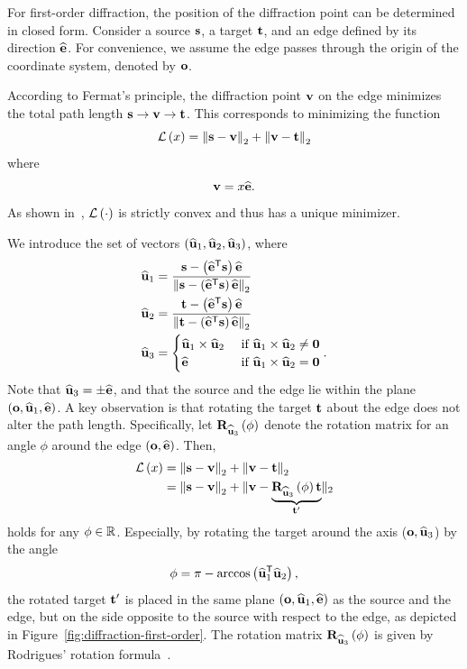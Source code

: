 For first-order diffraction, the position of the diffraction point can be determined in closed form.
Consider a source $\mathbf{s}$, a target $\mathbf{t}$, and an edge defined by its direction $\widehat{\mathbf{e}}$.
For convenience, we assume the edge passes through the origin of the coordinate system, denoted by $\mathbf{o}$.

According to Fermat's principle, the diffraction point $\mathbf{v}$ on the edge minimizes the total path length $\mathbf{s} \rightarrow \mathbf{v} \rightarrow \mathbf{t}$. This corresponds to minimizing the function
\begin{equation}
    {\cal L} \left( x \right) = \left\lVert\mathbf{s} - \mathbf{v}\right\rVert_2 + \left\lVert\mathbf{v} - \mathbf{t}\right\rVert_2
\end{equation}
where
\begin{equation}
    \mathbf{v} = x \widehat{\mathbf{e}}.
\end{equation}
As shown in~\cite{4200889}, ${\cal L}\left( \cdot \right)$ is strictly convex and thus has a unique minimizer.

We introduce the set of vectors $\left( \widehat{\mathbf{u}}_1, \widehat{\mathbf{u}}_2, \widehat{\mathbf{u}}_3 \right)$, where
\begin{align}
    \widehat{\mathbf{u}}_1 &= \frac{\mathbf{s} - \left(\widehat{\mathbf{e}}^{\mathsf{T}} \mathbf{s}\right) \widehat{\mathbf{e}}}{\left\lVert\mathbf{s} - \left(\widehat{\mathbf{e}}^{\mathsf{T}} \mathbf{s}\right) \widehat{\mathbf{e}}\right\rVert_2}\\
    \widehat{\mathbf{u}}_2 &=\frac{\mathbf{t} - \left(\widehat{\mathbf{e}}^{\mathsf{T}} \mathbf{s}\right) \widehat{\mathbf{e}}}{\left\lVert\mathbf{t} - \left(\widehat{\mathbf{e}}^{\mathsf{T}} \mathbf{s}\right) \widehat{\mathbf{e}}\right\rVert_2}\\
    \widehat{\mathbf{u}}_3 &=
    \begin{cases}
        \widehat{\mathbf{u}}_1 \times \widehat{\mathbf{u}}_2 & \text{ if } \widehat{\mathbf{u}}_1 \times \widehat{\mathbf{u}}_2 \neq \mathbf{0}\\
        \widehat{\mathbf{e}} & \text{ if } \widehat{\mathbf{u}}_1 \times \widehat{\mathbf{u}}_2 = \mathbf{0}
    \end{cases}
    .
\end{align}
Note that $\widehat{\mathbf{u}}_3 = \pm \widehat{\mathbf{e}}$, and that the source and the edge lie within the plane $\left( \mathbf{o}, \widehat{\mathbf{u}}_1, \widehat{\mathbf{e}} \right)$.
A key observation is that rotating the target $\mathbf{t}$ about the edge does not alter the path length.
Specifically, let $\mathbf{R}_{\widehat{\mathbf{u}}_3} \left( \phi \right)$ denote the rotation matrix for an angle $\phi$ around the edge $\left( \mathbf{o}, \widehat{\mathbf{e}} \right)$. Then,
\begin{align}
    {\cal L} \left( x \right) &= \left\lVert\mathbf{s} - \mathbf{v}\right\rVert_2 + \left\lVert\mathbf{v} - \mathbf{t}\right\rVert_2\\
    &= \left\lVert\mathbf{s} - \mathbf{v}\right\rVert_2 + \lVert\mathbf{v} - \underbrace{\mathbf{R}_{\widehat{\mathbf{u}}_3} \left( \phi \right) \mathbf{t}}_{\mathbf{t}'}\rVert_2\\
\end{align}
holds for any $\phi \in \mathbb{R}$.
Especially, by rotating the target around the axis ($\mathbf{o}, \widehat{\mathbf{u}}_3$) by the angle
\begin{equation}
    \phi = \pi - \arccos \left( \widehat{\mathbf{u}}_1^{\mathsf{T}} \widehat{\mathbf{u}}_2 \right),
\end{equation}
the rotated target $\mathbf{t}'$ is placed in the same plane $\left( \mathbf{o}, \widehat{\mathbf{u}}_1, \widehat{\mathbf{e}} \right)$ as the source and the edge, but on the side opposite to the source with respect to the edge, as depicted in Figure~\ref{fig:diffraction-first-order}.
The rotation matrix $\mathbf{R}_{\widehat{\mathbf{u}}_3} \left( \phi \right)$ is given by Rodrigues' rotation formula~\cite{Wikipedia_Rodrigues}.

